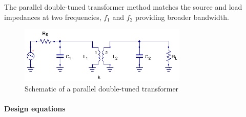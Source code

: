 \noindent The parallel double-tuned transformer method matches the source and load impedances at two frequencies, $f_1$ and $f_2$ providing broader bandwidth.

\begin{figure}[H]
\centering
\includegraphics[width=80mm]{./images/Synthesis/Impedance_Matching/parallel-double-tuned-transformer}
\caption{Schematic of a parallel double-tuned transformer}
\label{fig:parallel-double-tuned-transformer}
\end{figure}

\paragraph{Design equations \cite{RFMW_amp_osc_Abrie}}


